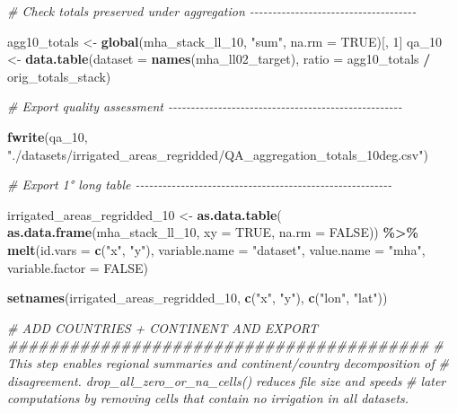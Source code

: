 \documentclass[
  11pt,
]{article}
\newenvironment{Shaded}{\begin{snugshade}}{\end{snugshade}}
\newcommand{\AttributeTok}[1]{\textcolor[rgb]{0.13,0.29,0.53}{#1}}
\newcommand{\CommentTok}[1]{\textcolor[rgb]{0.56,0.35,0.01}{\textit{#1}}}
\newcommand{\ConstantTok}[1]{\textcolor[rgb]{0.56,0.35,0.01}{#1}}
\newcommand{\DecValTok}[1]{\textcolor[rgb]{0.00,0.00,0.81}{#1}}
\newcommand{\FunctionTok}[1]{\textcolor[rgb]{0.13,0.29,0.53}{\textbf{#1}}}
\newcommand{\NormalTok}[1]{#1}
\newcommand{\OtherTok}[1]{\textcolor[rgb]{0.56,0.35,0.01}{#1}}
\newcommand{\SpecialCharTok}[1]{\textcolor[rgb]{0.81,0.36,0.00}{\textbf{#1}}}
\newcommand{\StringTok}[1]{\textcolor[rgb]{0.31,0.60,0.02}{#1}}
\begin{document}
\begin{Shaded}
\begin{Highlighting}[]
\CommentTok{\# Check totals preserved under aggregation {-}{-}{-}{-}{-}{-}{-}{-}{-}{-}{-}{-}{-}{-}{-}{-}{-}{-}{-}{-}{-}{-}{-}{-}{-}{-}{-}{-}{-}{-}{-}{-}{-}{-}{-}{-}{-}}

\NormalTok{agg10\_totals }\OtherTok{\textless{}{-}} \FunctionTok{global}\NormalTok{(mha\_stack\_ll\_10, }\StringTok{"sum"}\NormalTok{, }\AttributeTok{na.rm =} \ConstantTok{TRUE}\NormalTok{)[, }\DecValTok{1}\NormalTok{]}
\NormalTok{qa\_10 }\OtherTok{\textless{}{-}} \FunctionTok{data.table}\NormalTok{(}\AttributeTok{dataset =} \FunctionTok{names}\NormalTok{(mha\_ll02\_target),}
                    \AttributeTok{ratio =}\NormalTok{ agg10\_totals }\SpecialCharTok{/}\NormalTok{ orig\_totals\_stack)}

\CommentTok{\# Export quality assessment {-}{-}{-}{-}{-}{-}{-}{-}{-}{-}{-}{-}{-}{-}{-}{-}{-}{-}{-}{-}{-}{-}{-}{-}{-}{-}{-}{-}{-}{-}{-}{-}{-}{-}{-}{-}{-}{-}{-}{-}{-}{-}{-}{-}{-}{-}{-}{-}{-}{-}{-}{-}}

\FunctionTok{fwrite}\NormalTok{(qa\_10, }\StringTok{"./datasets/irrigated\_areas\_regridded/QA\_aggregation\_totals\_10deg.csv"}\NormalTok{)}

\CommentTok{\# Export 1° long table {-}{-}{-}{-}{-}{-}{-}{-}{-}{-}{-}{-}{-}{-}{-}{-}{-}{-}{-}{-}{-}{-}{-}{-}{-}{-}{-}{-}{-}{-}{-}{-}{-}{-}{-}{-}{-}{-}{-}{-}{-}{-}{-}{-}{-}{-}{-}{-}{-}{-}{-}{-}{-}{-}{-}{-}{-}}

\NormalTok{irrigated\_areas\_regridded\_10 }\OtherTok{\textless{}{-}} \FunctionTok{as.data.table}\NormalTok{(}
  \FunctionTok{as.data.frame}\NormalTok{(mha\_stack\_ll\_10, }\AttributeTok{xy =} \ConstantTok{TRUE}\NormalTok{, }\AttributeTok{na.rm =} \ConstantTok{FALSE}\NormalTok{)) }\SpecialCharTok{\%\textgreater{}\%}
  \FunctionTok{melt}\NormalTok{(}\AttributeTok{id.vars =} \FunctionTok{c}\NormalTok{(}\StringTok{"x"}\NormalTok{, }\StringTok{"y"}\NormalTok{), }\AttributeTok{variable.name =} \StringTok{"dataset"}\NormalTok{, }\AttributeTok{value.name =} \StringTok{"mha"}\NormalTok{,}
       \AttributeTok{variable.factor =} \ConstantTok{FALSE}\NormalTok{)}

\FunctionTok{setnames}\NormalTok{(irrigated\_areas\_regridded\_10, }\FunctionTok{c}\NormalTok{(}\StringTok{"x"}\NormalTok{, }\StringTok{"y"}\NormalTok{), }\FunctionTok{c}\NormalTok{(}\StringTok{"lon"}\NormalTok{, }\StringTok{"lat"}\NormalTok{))}

\CommentTok{\# ADD COUNTRIES + CONTINENT AND EXPORT \#\#\#\#\#\#\#\#\#\#\#\#\#\#\#\#\#\#\#\#\#\#\#\#\#\#\#\#\#\#\#\#\#\#\#\#\#\#\#\#\#}
\CommentTok{\# This step enables regional summaries and continent/country decomposition of }
\CommentTok{\# disagreement. drop\_all\_zero\_or\_na\_cells() reduces file size and speeds }
\CommentTok{\# later computations by removing cells that contain no irrigation in all datasets.}


\end{Highlighting}
\end{Shaded}
\end{document}
